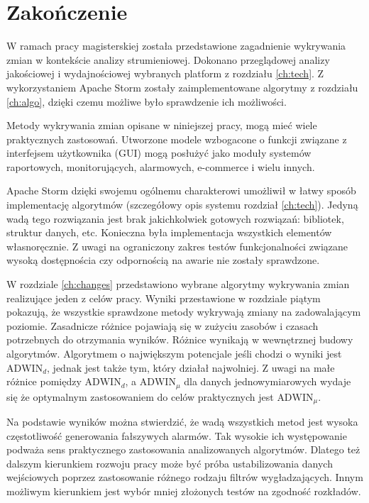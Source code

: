 \chapter{Zakończenie}
W ramach pracy magisterskiej została przedstawione zagadnienie wykrywania zmian w kontekście analizy strumieniowej.
Dokonano przeglądowej analizy jakościowej i wydajnościowej wybranych platform z rozdziału \ref{ch:tech}.
Z wykorzystaniem Apache Storm zostały zaimplementowane algorytmy z rozdziału \ref{ch:algo},
dzięki czemu możliwe było sprawdzenie ich możliwości.

Metody wykrywania zmian opisane w niniejszej pracy,
mogą mieć wiele praktycznych zastosowań.
Utworzone modele wzbogacone o funkcji związane z interfejsem użytkownika (GUI) mogą posłużyć
jako moduły systemów raportowych, monitorujących, alarmowych, e-commerce i wielu innych.

Apache Storm dzięki swojemu ogólnemu charakterowi umożliwił w łatwy sposób implementację algorytmów (szczegółowy opis systemu rozdział \ref{ch:tech}).
Jedyną wadą tego rozwiązania jest brak jakichkolwiek gotowych rozwiązań: bibliotek, struktur danych, etc.
Konieczna była implementacja wszystkich elementów własnoręcznie.
Z uwagi na ograniczony zakres testów funkcjonalności związane wysoką dostępnościa czy odpornością na awarie nie zostały sprawdzone.

W rozdziale \ref{ch:changes} przedstawiono wybrane algorytmy wykrywania zmian realizujące jeden z celów pracy.
Wyniki przestawione w rozdziale piątym pokazują,
że wszystkie sprawdzone metody wykrywają zmiany na zadowalającym poziomie.
Zasadnicze różnice pojawiają się w zużyciu zasobów i czasach potrzebnych do otrzymania wyników.
Różnice wynikają w wewnętrznej budowy algorytmów.
Algorytmem o największym potencjale jeśli chodzi o wyniki jest $\mbox{ADWIN}_d$,
jednak jest także tym, który działał najwolniej.
Z uwagi na małe różnice pomiędzy $\mbox{ADWIN}_d$, a $\mbox{ADWIN}_\mu$ dla danych jednowymiarowych
wydaje się że optymalnym zastosowaniem do celów praktycznych jest $\mbox{ADWIN}_\mu$.

Na podstawie wyników można stwierdzić,
że wadą wszystkich metod jest wysoka częstotliwość generowania fałszywych alarmów.
Tak wysokie ich występowanie podważa sens praktycznego zastosowania analizowanych algorytmów.
Dlatego też dalszym kierunkiem rozwoju pracy może być próba ustabilizowania danych wejściowych
poprzez zastosowanie różnego rodzaju filtrów wygładzających.
Innym możliwym kierunkiem jest wybór mniej złożonych testów na zgodność rozkładów.
